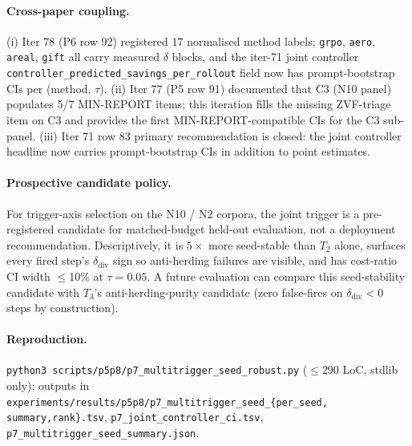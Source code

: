 \paragraph{Cross-paper coupling.}
(i) Iter 78 (P6 row 92) registered $17$ normalised method labels;
\texttt{grpo}, \texttt{aero}, \texttt{areal}, \texttt{gift} all carry
measured $\delta$ blocks, and the iter-71 joint controller
\texttt{controller\_predicted\_savings\_per\_rollout} field now has
prompt-bootstrap CIs per (method, $\tau$).  (ii) Iter 77 (P5 row 91)
documented that C3 (N10 panel) populates 5/7 MIN-REPORT items;
this iteration fills the missing ZVF-triage item on C3 and provides the
first MIN-REPORT-compatible CIs for the C3 sub-panel.  (iii) Iter 71
row 83 primary recommendation is closed: the joint controller headline
now carries prompt-bootstrap CIs in addition to point estimates.

\paragraph{Prospective candidate policy.}
For trigger-axis selection on the N10 / N2 corpora, the joint trigger is a
pre-registered candidate for matched-budget held-out evaluation, not a deployment
recommendation. Descriptively, it is $5\times$ more seed-stable than $T_2$
alone, surfaces every fired step's $\delta_{\mathrm{div}}$ sign so anti-herding
failures are visible, and has cost-ratio CI width $\leq$10\% at
$\tau{=}0.05$. A future evaluation can compare this seed-stability candidate
with $T_3$'s anti-herding-purity candidate (zero false-fires on
$\delta_{\mathrm{div}}{<}0$ steps by construction).

\paragraph{Reproduction.}
\texttt{python3 scripts/p5p8/p7\_multitrigger\_seed\_robust.py}
($\leq 290$ LoC, stdlib only); outputs in
\texttt{experiments/results/p5p8/p7\_multitrigger\_seed\_\{per\_seed,
summary,rank\}.tsv},
\texttt{p7\_joint\_controller\_ci.tsv},
\texttt{p7\_multitrigger\_seed\_summary.json}.
